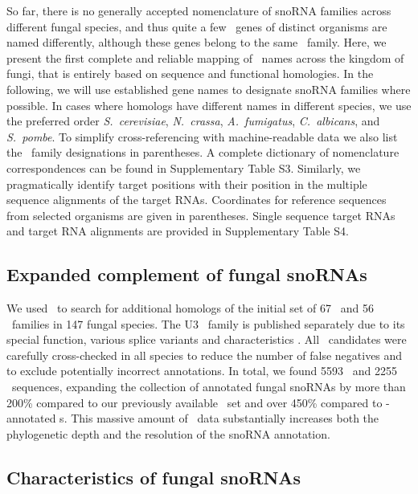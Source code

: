 So far, there is no generally accepted nomenclature of snoRNA
families across different fungal species, and thus quite a few \sno\ genes
of distinct organisms are named differently, although these genes belong to
the same \sno\ family. Here, we present the first complete and reliable
mapping of \sno\ names across the kingdom of fungi, that is entirely based
on sequence and functional homologies.  In the following, we will use
established gene names to designate snoRNA families where possible. In
cases where homologs have different names in different species, we use the
preferred order \emph{S.\ cerevisiae}, \emph{N.\ crassa}, \emph{A.\
  fumigatus}, \emph{C.\ albicans}, and \emph{S.\ pombe}. To simplify
cross-referencing with machine-readable data we also list the \snostrip\
family designations in parentheses.  A complete dictionary of nomenclature
correspondences can be found in Supplementary Table S3.  Similarly, we
pragmatically identify target positions with their position in the multiple
sequence alignments of the target RNAs. Coordinates for reference sequences
from selected organisms are given in parentheses.  Single sequence target
RNAs and target RNA alignments are provided in Supplementary Table S4.

\subsection{Expanded complement of fungal snoRNAs}

We used \snostrip\ to search for additional homologs of the initial set of
67 \cd\ and 56 \haca\ families in 147 fungal species. The U3 \sno\ family
is published separately due to its special function, various splice
variants and characteristics \cite{Canzler:2017}. All \snostrip\ candidates
were carefully cross-checked in all species to reduce the number of false
negatives and to exclude potentially incorrect annotations.  In total, we
found 5593 \cd\ and 2255 \haca\ sequences, expanding the collection of
annotated fungal snoRNAs by more than 200\% compared to our previously
available \sno\ set \cite{Bartschat:2014} and over 450\% compared to
\rfam{}-annotated \sno s. This massive amount of \sno\ data substantially
increases both the phylogenetic depth and the resolution of the snoRNA
annotation.

\subsection{Characteristics of fungal snoRNAs}

